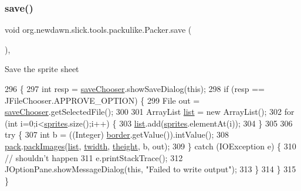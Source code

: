 \subsubsection{\texorpdfstring{save()}{save()}}
{\footnotesize\ttfamily void org.\+newdawn.\+slick.\+tools.\+packulike.\+Packer.\+save (\begin{DoxyParamCaption}{ }\end{DoxyParamCaption})\hspace{0.3cm}{\ttfamily [inline]}, {\ttfamily [private]}}

Save the sprite sheet 
\begin{DoxyCode}
296                         \{
297         \textcolor{keywordtype}{int} resp = \mbox{\hyperlink{classorg_1_1newdawn_1_1slick_1_1tools_1_1packulike_1_1_packer_a29ef57b7ec0b9ffa079a40890b9ac78b}{saveChooser}}.showSaveDialog(\textcolor{keyword}{this});
298         \textcolor{keywordflow}{if} (resp == JFileChooser.APPROVE\_OPTION) \{
299             File out = \mbox{\hyperlink{classorg_1_1newdawn_1_1slick_1_1tools_1_1packulike_1_1_packer_a29ef57b7ec0b9ffa079a40890b9ac78b}{saveChooser}}.getSelectedFile();
300             
301             ArrayList \mbox{\hyperlink{classorg_1_1newdawn_1_1slick_1_1tools_1_1packulike_1_1_packer_a45e8438e951eb84f2efaf06e5ae481bd}{list}} = \textcolor{keyword}{new} ArrayList();
302             \textcolor{keywordflow}{for} (\textcolor{keywordtype}{int} i=0;i<\mbox{\hyperlink{classorg_1_1newdawn_1_1slick_1_1tools_1_1packulike_1_1_packer_a5684e96219ce89e574c4550d3c650eaa}{sprites}}.size();i++) \{
303                 \mbox{\hyperlink{classorg_1_1newdawn_1_1slick_1_1tools_1_1packulike_1_1_packer_a45e8438e951eb84f2efaf06e5ae481bd}{list}}.add(\mbox{\hyperlink{classorg_1_1newdawn_1_1slick_1_1tools_1_1packulike_1_1_packer_a5684e96219ce89e574c4550d3c650eaa}{sprites}}.elementAt(i));
304             \}
305             
306             \textcolor{keywordflow}{try} \{
307                 \textcolor{keywordtype}{int} b = ((Integer) \mbox{\hyperlink{classorg_1_1newdawn_1_1slick_1_1tools_1_1packulike_1_1_packer_ad52e9b53a46d3aa9a1b2f66755558055}{border}}.getValue()).intValue();
308                 \mbox{\hyperlink{classorg_1_1newdawn_1_1slick_1_1tools_1_1packulike_1_1_packer_a7e75cbdd91211b7a08a6a5a587575fe6}{pack}}.\mbox{\hyperlink{classorg_1_1newdawn_1_1slick_1_1tools_1_1packulike_1_1_pack_a303621f1e4590a9898ccbac6daa6c112}{packImages}}(\mbox{\hyperlink{classorg_1_1newdawn_1_1slick_1_1tools_1_1packulike_1_1_packer_a45e8438e951eb84f2efaf06e5ae481bd}{list}}, \mbox{\hyperlink{classorg_1_1newdawn_1_1slick_1_1tools_1_1packulike_1_1_packer_ad8d50a999815f740d8690c45e408db6c}{twidth}}, \mbox{\hyperlink{classorg_1_1newdawn_1_1slick_1_1tools_1_1packulike_1_1_packer_ae627e80430f7f495a1c7542ea9040668}{theight}}, b, out);
309             \} \textcolor{keywordflow}{catch} (IOException e) \{
310                 \textcolor{comment}{// shouldn't happen }
311                 e.printStackTrace();
312                 JOptionPane.showMessageDialog(\textcolor{keyword}{this}, \textcolor{stringliteral}{"Failed to write output"});
313             \}
314         \}
315     \}
\end{DoxyCode}
